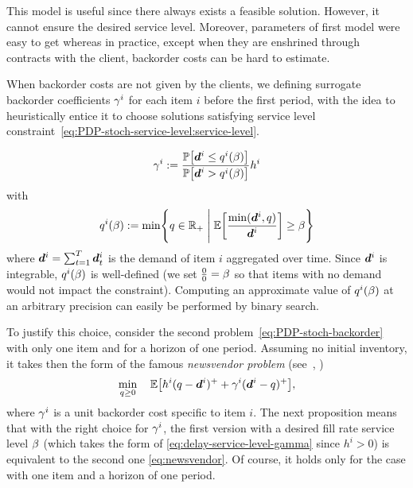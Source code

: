 This model is useful since there always exists a feasible solution. However, it cannot ensure the desired service level. Moreover, parameters of first model were easy to get whereas in practice, except when they are enshrined through contracts with the client, backorder costs can be hard to estimate.

\medskip

When backorder costs are not given by the clients, we defining surrogate backorder coefficients $\gamma^i$ for each item $i$ before the first period, with the idea to heuristically entice it to choose solutions satisfying service level constraint~\eqref{eq:PDP-stoch-service-level:service-level}.

\begin{equation}
\backorder^i := \frac{\prob\sqbracket{\va\demand^i \le q^i(\servicelvl)}}{\prob\sqbracket{\va\demand^i>q^i(\servicelvl)}} \holding^i
\label{eq:delay-service-level-gamma}
\end{equation}
with
\begin{equation}
q^i(\servicelvl) :=
\min \crbracket{
  q\in \RR_+ \; \Bigg| \; \espe\sqbracket{\frac{\min(\va\demand^i,q)}{\va\demand^i}} \ge \servicelvl
}
\label{eq:delay-service-level-ell}
\end{equation}
where $\va\demand^i = \sum_{t=1}^{\horizon} \va \demand_t^i$ is the demand of item $i$ aggregated over time. Since $\va \demand^i$ is integrable, $q^i(\beta)$ is well-defined
(we set $\frac{0}{0}=\beta$ so that items with no demand would not impact the constraint).
Computing an approximate value of $q^i(\beta)$ at an arbitrary precision can easily be performed by binary search.


To justify this choice, consider the second problem~\eqref{eq:PDP-stoch-backorder} with only one item and for a horizon of one period. Assuming no initial inventory, it takes then the form of the famous \emph{newsvendor problem} (see~\eg, \cite[Chapter 1]{Shapiro2009})
\begin{equation}
\label{eq:newsvendor}
\min_{q\ge 0} \quad \espe\sqbracket{h^i (q - \va d^i )^+ + \backorder^i ( \va d^i - q)^+},
\end{equation}
where $\gamma^i$ is a unit backorder cost specific to item $i$.
The next proposition means that with the right choice for $\gamma^i$, the first version with a desired fill rate service level $\beta$ (which takes the form of \eqref{eq:delay-service-level-gamma} since $h^i>0$) is equivalent to the second one \eqref{eq:newsvendor}. Of course, it holds only for the case with one item and a horizon of one period.

